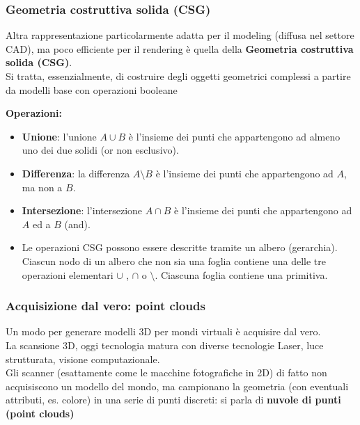 \documentclass[a4paper, 10pt]{article}
\begin{document}
		\subsubsection{Geometria costruttiva solida (CSG)}
		
		Altra rappresentazione particolarmente adatta per il modeling
		(diffusa nel settore CAD), ma poco efficiente per il rendering è quella della
		\textbf{Geometria costruttiva solida (CSG)}.\\
		Si tratta, essenzialmente, di costruire degli oggetti geometrici
		complessi a partire da modelli base con operazioni booleane
		
		\noindent
		\textbf{Operazioni:}
		\begin{itemize}
			\item \textbf{Unione}: l’unione $ A \cup B $ è l’insieme dei punti che appartengono
			ad almeno uno dei due solidi (or non esclusivo).
			\item \textbf{Differenza}: la differenza $ A \setminus B $ è l’insieme dei punti che
			appartengono ad $ A $, ma non a $ B $.
			\item \textbf{Intersezione}: l’intersezione $ A \cap B $ è l’insieme dei punti che
			appartengono ad $ A $ ed a $ B $ (and).
			\item Le operazioni CSG possono essere descritte tramite un albero
			(gerarchia).
			Ciascun nodo di un albero che non sia una foglia contiene una
			delle tre operazioni elementari $ \cup $ , $ \cap $ o $ \setminus $.
			Ciascuna foglia contiene una primitiva.
		\end{itemize}
		
		\subsubsection{Acquisizione dal vero: point clouds}
			Un modo per generare modelli 3D per mondi virtuali è
			acquisire dal vero.\\
			La scansione 3D, oggi tecnologia matura con diverse tecnologie
			Laser, luce strutturata, visione computazionale.\\
			Gli scanner (esattamente come le macchine fotografiche in 2D)
			di fatto non acquisiscono un modello del mondo, ma
			campionano la geometria (con eventuali attributi, es. colore) in
			una serie di punti discreti: si parla di \textbf{nuvole di punti (point
			clouds)}
		
\end{document}

